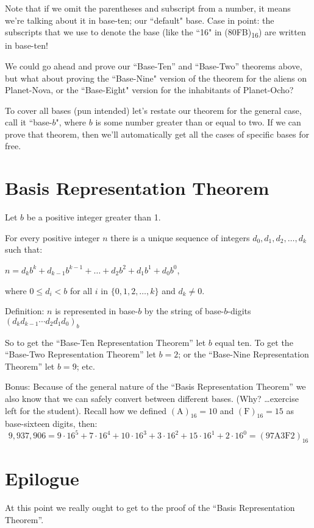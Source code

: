 \documentclass{article}
\newenvironment{jprIn}{\begin{adjustwidth}{2em}{}}{\end{adjustwidth}}
\begin{document}
Note that if we omit the parentheses and subscript from a number,
it means we're talking about it in base-ten; our ``default" base.
Case in point: the subscripts that we use to denote the base
(like the ``16" in (80FB)\textsubscript{16}) are written in base-ten!

We could go ahead and prove our ``Base-Ten'' and ``Base-Two'' theorems above,
but what about proving the ``Base-Nine" version of the theorem for the aliens on Planet-Nova,
or the ``Base-Eight" version for the inhabitants of Planet-Ocho?

To cover all bases (pun intended) let's restate our theorem for the general case,
call it ``base-$b$",
where $b$ is some number greater than or equal to two.
If we can prove that theorem,
then we'll automatically get all the cases of specific bases for free.

\section*{Basis Representation Theorem}
\begin{jprIn}
Let $b$ be a positive integer greater than 1.

For every positive integer $n$ there is a unique sequence
of integers $d_0, d_1, d_2,\dots{},d_k$ such that:

\hspace{3em}$n=d_kb^k+d_{k-1}b^{k-1}+\dots+d_2b^2+d_1b^1+d_0b^0$,

where $0\le{}d_i<b$ for all $i$ in $\{0,1,2,\dots{},k\}$ and $d_k\ne0$.

Definition: $n$ is represented in base-$b$ by the string
of base-$b$-digits $(d_kd_{k-1}{\cdots}d_2d_1d_0)_b$
\end{jprIn}
\bigskip

So to get the ``Base-Ten Representation Theorem'' let $b$ equal ten.
To get the ``Base-Two Representation Theorem'' let $b=2$; or the ``Base-Nine Representation Theorem''
let $b=9$; etc.

Bonus: Because of the general nature of the ``Basis Representation Theorem''
we also know that we can safely convert between
different bases. (Why? \dots{}exercise left for the student).
Recall how we defined $(\text{A})_{16}=10$
and $(\text{F})_{16}=15$ as base-sixteen digits, then:
\[9,937,906=9\cdot{}16^5+7\cdot{}16^4+10\cdot{}16^3+3\cdot{}16^2+15\cdot{}16^1+2\cdot{}16^0=(\text{97A3F2})_{16}\]

\section*{Epilogue}
At this point we really ought to get to the proof of the ``Basis Representation Theorem''.
\end{document}
